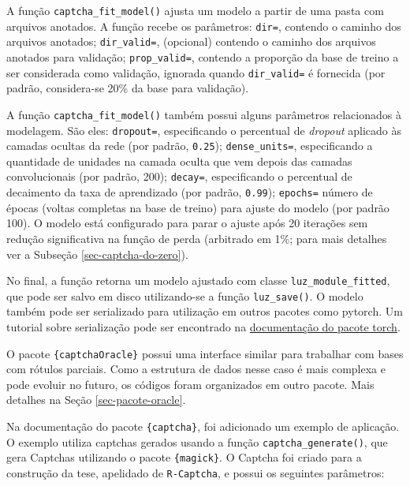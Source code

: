 \documentclass[12pt,twoside,brazilian]{book}
\begin{document}
A função \texttt{captcha\_fit\_model()} ajusta um modelo a partir de uma
pasta com arquivos anotados. A função recebe os parâmetros:
\texttt{dir=}, contendo o caminho dos arquivos anotados;
\texttt{dir\_valid=}, (opcional) contendo o caminho dos arquivos
anotados para validação; \texttt{prop\_valid=}, contendo a proporção da
base de treino a ser considerada como validação, ignorada quando
\texttt{dir\_valid=} é fornecida (por padrão, considera-se 20\% da base
para validação).

A função \texttt{captcha\_fit\_model()} também possui alguns parâmetros
relacionados à modelagem. São eles: \texttt{dropout=}, especificando o
percentual de \emph{dropout} aplicado às camadas ocultas da rede (por
padrão, \texttt{0.25}); \texttt{dense\_units=}, especificando a
quantidade de unidades na camada oculta que vem depois das camadas
convolucionais (por padrão, 200); \texttt{decay=}, especificando o
percentual de decaimento da taxa de aprendizado (por padrão,
\texttt{0.99}); \texttt{epochs=} número de épocas (voltas completas na
base de treino) para ajuste do modelo (por padrão 100). O modelo está
configurado para parar o ajuste após 20 iterações sem redução
significativa na função de perda (arbitrado em 1\%; para mais detalhes
ver a Subseção \ref{sec-captcha-do-zero}).

No final, a função retorna um modelo ajustado com classe
\texttt{luz\_module\_fitted}, que pode ser salvo em disco utilizando-se
a função \texttt{luz\_save()}. O modelo também pode ser serializado para
utilização em outros pacotes como pytorch. Um tutorial sobre
serialização pode ser encontrado na
\href{https://torch.mlverse.org/docs/articles/serialization.html}{documentação
do pacote torch}.

O pacote \texttt{\{captchaOracle\}} possui uma interface similar para
trabalhar com bases com rótulos parciais. Como a estrutura de dados
nesse caso é mais complexa e pode evoluir no futuro, os códigos foram
organizados em outro pacote. Mais detalhes na Seção
\ref{sec-pacote-oracle}.

Na documentação do pacote \texttt{\{captcha\}}, foi adicionado um
exemplo de aplicação. O exemplo utiliza captchas gerados usando a função
\texttt{captcha\_generate()}, que gera Captchas utilizando o pacote
\texttt{\{magick\}}. O Captcha foi criado para a construção da tese,
apelidado de \texttt{R-Captcha}, e possui os seguintes parâmetros:
\end{document}
